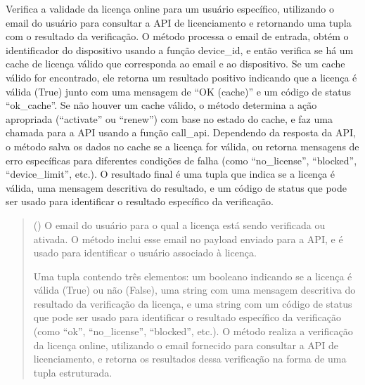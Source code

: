 \documentclass[letterpaper,10pt,english]{sphinxmanual}
\begin{document}
\begin{fulllineitems}
\label{\detokenize{api/online_license:online_license.ensure_online_license}}
\pysigstartsignatures
\pysiglinewithargsret
{}
{}
{}
\pysigstopsignatures
\sphinxAtStartPar
Verifica a validade da licença online para um usuário específico, utilizando o e\sphinxhyphen{}mail do usuário para consultar a API de licenciamento e retornando uma tupla com o resultado da verificação. O método processa o e\sphinxhyphen{}mail de entrada, obtém o identificador do dispositivo usando a função device\_id, e então verifica se há um cache de licença válido que corresponda ao e\sphinxhyphen{}mail e ao dispositivo. Se um cache válido for encontrado, ele retorna um resultado positivo indicando que a licença é válida (True) junto com uma mensagem de “OK (cache)” e um código de status “ok\_cache”. Se não houver um cache válido, o método determina a ação apropriada (“activate” ou “renew”) com base no estado do cache, e faz uma chamada para a API usando a função call\_api. Dependendo da resposta da API, o método salva os dados no cache se a licença for válida, ou retorna mensagens de erro específicas para diferentes condições de falha (como “no\_license”, “blocked”, “device\_limit”, etc.). O resultado final é uma tupla que indica se a licença é válida, uma mensagem descritiva do resultado, e um código de status que pode ser usado para identificar o resultado específico da verificação.
\begin{quote}\begin{description}
\sphinxAtStartPar
{} () \textendash{} O e\sphinxhyphen{}mail do usuário para o qual a licença está sendo verificada ou ativada. O método inclui esse e\sphinxhyphen{}mail no payload enviado para a API, e é usado para identificar o usuário associado à licença.

\sphinxAtStartPar
Uma tupla contendo três elementos: um booleano indicando se a licença é válida (True) ou não (False), uma string com uma mensagem descritiva do resultado da verificação da licença, e uma string com um código de status que pode ser usado para identificar o resultado específico da verificação (como “ok”, “no\_license”, “blocked”, etc.). O método realiza a verificação da licença online, utilizando o e\sphinxhyphen{}mail fornecido para consultar a API de licenciamento, e retorna os resultados dessa verificação na forma de uma tupla estruturada.

\sphinxAtStartPar
{}

\end{description}\end{quote}

\end{fulllineitems}
\end{document}
